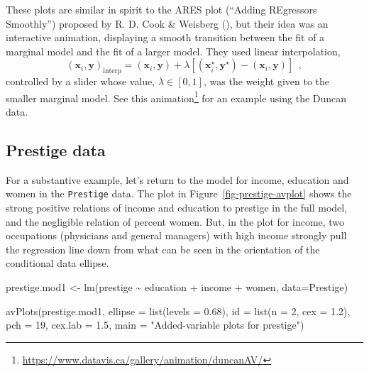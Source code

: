 \documentclass[
  letterpaper,
  10pt,
  krantz2]{krantz}
\makeatletter
\newenvironment{Shaded}{\begin{snugshade}}{\end{snugshade}}
\newcommand{\AttributeTok}[1]{\textcolor[rgb]{0.40,0.45,0.13}{#1}}
\newcommand{\DecValTok}[1]{\textcolor[rgb]{0.68,0.00,0.00}{#1}}
\newcommand{\FloatTok}[1]{\textcolor[rgb]{0.68,0.00,0.00}{#1}}
\newcommand{\FunctionTok}[1]{\textcolor[rgb]{0.28,0.35,0.67}{#1}}
\newcommand{\NormalTok}[1]{\textcolor[rgb]{0.00,0.23,0.31}{#1}}
\newcommand{\OtherTok}[1]{\textcolor[rgb]{0.00,0.23,0.31}{#1}}
\newcommand{\SpecialCharTok}[1]{\textcolor[rgb]{0.37,0.37,0.37}{#1}}
\newcommand{\StringTok}[1]{\textcolor[rgb]{0.13,0.47,0.30}{#1}}
\providecommand{\href}[2]{#2\footnote{\url{#1}}}
\newenvironment{kframe}{%
  \medskip{}
  \setlength{\fboxsep}{.8em}
  \def\at@end@of@kframe{}%
  \ifinner\ifhmode%
  \def\at@end@of@kframe{\end{minipage}}%
  \begin{minipage}{\columnwidth}%
  \fi\fi%
  \def\FrameCommand##1{\hskip\@totalleftmargin \hskip-\fboxsep
  \colorbox{shadecolor}{##1}\hskip-\fboxsep
      \hskip-\linewidth \hskip-\@totalleftmargin \hskip\columnwidth}%
  \MakeFramed {\advance\hsize-\width
    \@totalleftmargin\z@ \linewidth\hsize
    \@setminipage}}%
{\par\unskip\endMakeFramed%
  \at@end@of@kframe}
\renewenvironment{Shaded}{\begin{kframe}}{\end{kframe}}
\makeatother
\begin{document}
These plots are similar in spirit to the ARES plot (``Adding REgressors
Smoothly'') proposed by R. D. Cook \& Weisberg
(), but their idea was an
interactive animation, displaying a smooth transition between the fit of
a marginal model and the fit of a larger model. They used linear
interpolation, \[
(\mathbf{x}_i, \mathbf{y})_{\text{interp}} = (\mathbf{x}_i, \mathbf{y}) + \lambda [(\mathbf{x}_i^\star, \mathbf{y}^\star) - (\mathbf{x}_i, \mathbf{y})] \:\: ,
\] controlled by a slider whose value, \(\lambda \in [0, 1]\), was the
weight given to the smaller marginal model. See
\href{https://www.datavis.ca/gallery/animation/duncanAV/}{this
animation} for an example using the Duncan data.

\subsection{Prestige data}\label{prestige-data}

For a substantive example, let's return to the model for income,
education and women in the \texttt{Prestige} data. The plot in
Figure~\ref{fig-prestige-avplot} shows the strong positive relations of
income and education to prestige in the full model, and the negligible
relation of percent women. But, in the plot for income, two occupations
(physicians and general managers) with high income strongly pull the
regression line down from what can be seen in the orientation of the
conditional data ellipse.

\begin{Shaded}
\begin{Highlighting}[]
\NormalTok{prestige.mod1 }\OtherTok{\textless{}{-}} \FunctionTok{lm}\NormalTok{(prestige }\SpecialCharTok{\textasciitilde{}}\NormalTok{ education }\SpecialCharTok{+}\NormalTok{ income }\SpecialCharTok{+}\NormalTok{ women,}
           \AttributeTok{data=}\NormalTok{Prestige)}

\FunctionTok{avPlots}\NormalTok{(prestige.mod1, }
  \AttributeTok{ellipse =} \FunctionTok{list}\NormalTok{(}\AttributeTok{levels =} \FloatTok{0.68}\NormalTok{),}
  \AttributeTok{id =} \FunctionTok{list}\NormalTok{(}\AttributeTok{n =} \DecValTok{2}\NormalTok{, }\AttributeTok{cex =} \FloatTok{1.2}\NormalTok{),}
  \AttributeTok{pch =} \DecValTok{19}\NormalTok{,}
  \AttributeTok{cex.lab =} \FloatTok{1.5}\NormalTok{,}
  \AttributeTok{main =} \StringTok{"Added{-}variable plots for prestige"}\NormalTok{)}
\end{Highlighting}
\end{Shaded}
\end{document}
